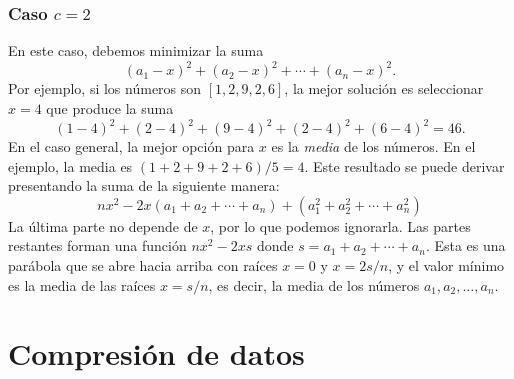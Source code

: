 \subsubsection{Caso $c=2$}

En este caso, debemos minimizar la suma
\[(a_1-x)^2+(a_2-x)^2+\cdots+(a_n-x)^2.\]
Por ejemplo, si los números son $[1,2,9,2,6]$,
la mejor solución es seleccionar $x=4$
que produce la suma
\[
(1-4)^2+(2-4)^2+(9-4)^2+(2-4)^2+(6-4)^2=46.
\]
En el caso general, la mejor opción para $x$
es la \emph{media} de los números.
En el ejemplo, la media es $(1+2+9+2+6)/5=4$.
Este resultado se puede derivar presentando
la suma de la siguiente manera:
\[
nx^2 - 2x(a_1+a_2+\cdots+a_n) + (a_1^2+a_2^2+\cdots+a_n^2)
\]
La última parte no depende de $x$,
por lo que podemos ignorarla.
Las partes restantes forman una función
$nx^2-2xs$ donde $s=a_1+a_2+\cdots+a_n$.
Esta es una parábola que se abre hacia arriba
con raíces $x=0$ y $x=2s/n$,
y el valor mínimo es la media
de las raíces $x=s/n$, es decir,
la media de los números $a_1,a_2,\ldots,a_n$.

\section{Compresión de datos}




